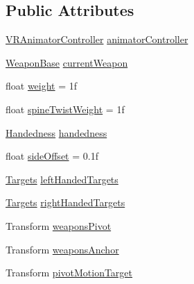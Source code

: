 \subsection*{Public Attributes}
\begin{DoxyCompactItemize}
\item 
\mbox{\hyperlink{class_root_motion_1_1_demos_1_1_v_r_animator_controller}{V\+R\+Animator\+Controller}} \mbox{\hyperlink{class_root_motion_1_1_demos_1_1_v_r_aiming_controller_a4adf92a8752d112a38b0f7227f41359f}{animator\+Controller}}
\item 
\mbox{\hyperlink{class_root_motion_1_1_demos_1_1_weapon_base}{Weapon\+Base}} \mbox{\hyperlink{class_root_motion_1_1_demos_1_1_v_r_aiming_controller_aeac2a0bfa5586abce0d19104b82b967b}{current\+Weapon}}
\item 
float \mbox{\hyperlink{class_root_motion_1_1_demos_1_1_v_r_aiming_controller_a3165b535b76344b266cea3ec047fd6e5}{weight}} = 1f
\item 
float \mbox{\hyperlink{class_root_motion_1_1_demos_1_1_v_r_aiming_controller_a39e139308adb4666fd7fdc490189a3ed}{spine\+Twist\+Weight}} = 1f
\item 
\mbox{\hyperlink{class_root_motion_1_1_demos_1_1_v_r_aiming_controller_ab88bf3b4946db8022f1a2049e3fc9399}{Handedness}} \mbox{\hyperlink{class_root_motion_1_1_demos_1_1_v_r_aiming_controller_aaf70e369f4b6afc75b0d2fd39b7cd151}{handedness}}
\item 
float \mbox{\hyperlink{class_root_motion_1_1_demos_1_1_v_r_aiming_controller_a573a4f23d1b58d71cf5aae53c1188b37}{side\+Offset}} = 0.\+1f
\item 
\mbox{\hyperlink{struct_root_motion_1_1_demos_1_1_v_r_aiming_controller_1_1_targets}{Targets}} \mbox{\hyperlink{class_root_motion_1_1_demos_1_1_v_r_aiming_controller_ae4024252e08d42e68c70c95eabc83f1a}{left\+Handed\+Targets}}
\item 
\mbox{\hyperlink{struct_root_motion_1_1_demos_1_1_v_r_aiming_controller_1_1_targets}{Targets}} \mbox{\hyperlink{class_root_motion_1_1_demos_1_1_v_r_aiming_controller_a24663be32b395b62fbdb07192c977478}{right\+Handed\+Targets}}
\item 
Transform \mbox{\hyperlink{class_root_motion_1_1_demos_1_1_v_r_aiming_controller_afa0172fdd1f8cf9ebee12261c514f0b8}{weapons\+Pivot}}
\item 
Transform \mbox{\hyperlink{class_root_motion_1_1_demos_1_1_v_r_aiming_controller_a98b44bcc95c0f555e09fc2ecd124bef7}{weapons\+Anchor}}
\item 
Transform \mbox{\hyperlink{class_root_motion_1_1_demos_1_1_v_r_aiming_controller_a3a845b81233fc8f78c93bcc93cb0cfa5}{pivot\+Motion\+Target}}

\end{DoxyCompactItemize}
